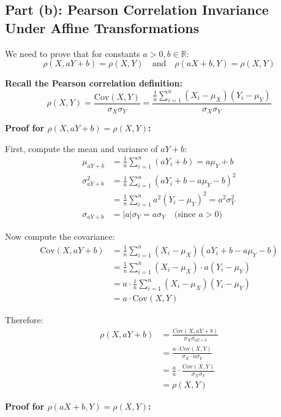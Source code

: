 \documentclass[12pt]{article}
\begin{document}
\subsection{Part (b): Pearson Correlation Invariance Under Affine Transformations}

\begin{solution}
We need to prove that for constants \(a > 0, b \in \mathbb{R}\):
\[
\rho(X, aY + b) = \rho(X, Y) \quad \text{and} \quad \rho(aX + b, Y) = \rho(X, Y)
\]

\textbf{Recall the Pearson correlation definition:}
\[
\rho(X, Y) = \frac{\text{Cov}(X, Y)}{\sigma_X \sigma_Y} = \frac{\frac{1}{n}\sum_{i=1}^{n}(X_i - \mu_X)(Y_i - \mu_Y)}{\sigma_X \sigma_Y}
\]

\textbf{Proof for \(\rho(X, aY + b) = \rho(X, Y)\):}

First, compute the mean and variance of \(aY + b\):
\begin{align*}
\mu_{aY+b} &= \frac{1}{n}\sum_{i=1}^{n}(aY_i + b) = a\mu_Y + b \\
\sigma_{aY+b}^2 &= \frac{1}{n}\sum_{i=1}^{n}(aY_i + b - a\mu_Y - b)^2 \\
&= \frac{1}{n}\sum_{i=1}^{n}a^2(Y_i - \mu_Y)^2 = a^2\sigma_Y^2 \\
\sigma_{aY+b} &= |a|\sigma_Y = a\sigma_Y \quad \text{(since } a > 0\text{)}
\end{align*}

Now compute the covariance:
\begin{align*}
\text{Cov}(X, aY + b) &= \frac{1}{n}\sum_{i=1}^{n}(X_i - \mu_X)(aY_i + b - a\mu_Y - b) \\
&= \frac{1}{n}\sum_{i=1}^{n}(X_i - \mu_X) \cdot a(Y_i - \mu_Y) \\
&= a \cdot \frac{1}{n}\sum_{i=1}^{n}(X_i - \mu_X)(Y_i - \mu_Y) \\
&= a \cdot \text{Cov}(X, Y)
\end{align*}

Therefore:
\begin{align*}
\rho(X, aY + b) &= \frac{\text{Cov}(X, aY + b)}{\sigma_X \sigma_{aY+b}} \\
&= \frac{a \cdot \text{Cov}(X, Y)}{\sigma_X \cdot a\sigma_Y} \\
&= \frac{a}{a} \cdot \frac{\text{Cov}(X, Y)}{\sigma_X \sigma_Y} \\
&= \rho(X, Y)
\end{align*}

\textbf{Proof for \(\rho(aX + b, Y) = \rho(X, Y)\):}


\end{solution}
\end{document}
